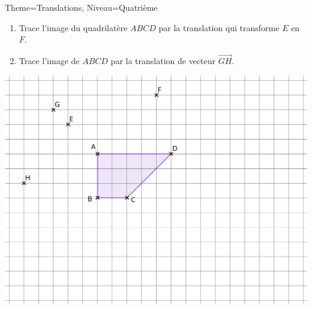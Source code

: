 \documentclass[11pt]{article}
\begin{document}
\begin{Maquette}[Fiche]{Theme=Translations, Niveau=Quatrième}
\begin{exercice}
    \begin{enumerate}
        \item Trace l’image du quadrilatère $ABCD$ par la translation qui transforme $E$ en $F$.
        \item Trace l’image de $ABCD$ par la translation de vecteur $\overrightarrow{GH}$.
    \end{enumerate}
    \begin{center}
        \includegraphics[width=.75\linewidth]{Images/exercice3.png}
    \end{center}
\end{exercice}
\end{Maquette}
\end{document}
